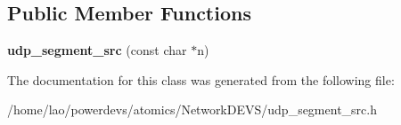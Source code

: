 \subsection*{Public Member Functions}
\begin{DoxyCompactItemize}
\item 
{\bfseries udp\+\_\+segment\+\_\+src} (const char $\ast$n)\hypertarget{classudp__segment__src_a22edeab46f4ea63b712b4236d773848a}{}\label{classudp__segment__src_a22edeab46f4ea63b712b4236d773848a}

\end{DoxyCompactItemize}


The documentation for this class was generated from the following file\+:\begin{DoxyCompactItemize}
\item 
/home/lao/powerdevs/atomics/\+Network\+D\+E\+V\+S/udp\+\_\+segment\+\_\+src.\+h\end{DoxyCompactItemize}
